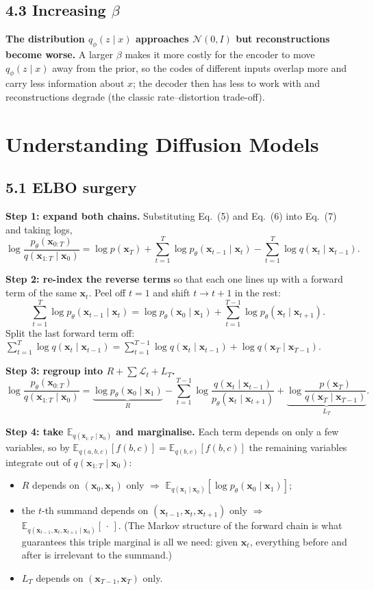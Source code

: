\documentclass[11pt,a4paper]{article}
\newcommand{\E}{\mathbb{E}}
\newcommand{\N}{\mathcal{N}}
\newcommand{\x}{\mathbf{x}}
\begin{document}
\subsection*{4.3 Increasing $\beta$}

\textbf{The distribution $q_\phi(z\mid x)$ approaches $\N(0,I)$ but reconstructions become worse.}
A larger $\beta$ makes it more costly for the encoder to move $q_\phi(z\mid x)$ away from the prior, so the codes of different inputs overlap more and carry less information about $x$; the decoder then has less to work with and reconstructions degrade (the classic rate--distortion trade-off).

\section{Understanding Diffusion Models}

\subsection*{5.1 ELBO surgery}

\textbf{Step 1: expand both chains.} Substituting Eq.~(5) and Eq.~(6) into Eq.~(7) and taking logs,
\[
\log\frac{p_\theta(\x_{0:T})}{q(\x_{1:T}\mid\x_0)}
= \log p(\x_T) + \sum_{t=1}^{T}\log p_\theta(\x_{t-1}\mid\x_t) - \sum_{t=1}^{T}\log q(\x_t\mid\x_{t-1}).
\]

\textbf{Step 2: re-index the reverse terms} so that each one lines up with a forward term of the same $\x_t$. Peel off $t=1$ and shift $t\to t+1$ in the rest:
\[
\sum_{t=1}^{T}\log p_\theta(\x_{t-1}\mid\x_t)
=\log p_\theta(\x_0\mid\x_1) + \sum_{t=1}^{T-1}\log p_\theta(\x_t\mid\x_{t+1}).
\]
Split the last forward term off:
$\sum_{t=1}^{T}\log q(\x_t\mid\x_{t-1}) = \sum_{t=1}^{T-1}\log q(\x_t\mid\x_{t-1}) + \log q(\x_T\mid\x_{T-1}).$

\textbf{Step 3: regroup into $R + \sum \mathcal{L}_t + L_T$.}
\[
\log\frac{p_\theta(\x_{0:T})}{q(\x_{1:T}\mid\x_0)}
=\underbrace{\log p_\theta(\x_0\mid\x_1)}_{R}
-\sum_{t=1}^{T-1}\log\frac{q(\x_t\mid\x_{t-1})}{p_\theta(\x_t\mid\x_{t+1})}
+\underbrace{\log\frac{p(\x_T)}{q(\x_T\mid\x_{T-1})}}_{L_T}.
\]

\textbf{Step 4: take $\E_{q(\x_{1:T}\mid\x_0)}$ and marginalise.} Each term depends on only a few variables, so by $\E_{q(a,b,c)}[f(b,c)]=\E_{q(b,c)}[f(b,c)]$ the remaining variables integrate out of $q(\x_{1:T}\mid\x_0)$:
\begin{itemize}[nosep]
\item $R$ depends on $(\x_0,\x_1)$ only $\Rightarrow$ $\E_{q(\x_1\mid\x_0)}[\log p_\theta(\x_0\mid\x_1)]$;
\item the $t$-th summand depends on $(\x_{t-1},\x_t,\x_{t+1})$ only $\Rightarrow$ $\E_{q(\x_{t-1},\x_t,\x_{t+1}\mid\x_0)}[\,\cdot\,]$. (The Markov structure of the forward chain is what guarantees this triple marginal is all we need: given $\x_t$, everything before and after is irrelevant to the summand.)
\item $L_T$ depends on $(\x_{T-1},\x_T)$ only.
\end{itemize}
\end{document}
